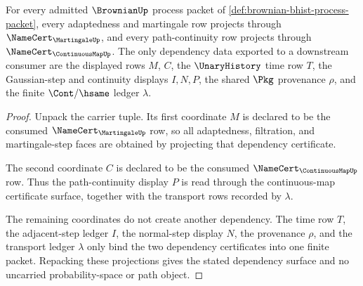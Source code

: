 \begin{theorem}
\label{thm:brownian-martingale-continuousmap-dependency-surface}
For every admitted $\BrownianUp$ process packet of
\autoref{def:brownian-bhist-process-packet}, every adaptedness and martingale
row projects through $\NameCert_{\MartingaleUp}$, and every path-continuity
row projects through $\NameCert_{\ContinuousMapUp}$. The only dependency data
exported to a downstream consumer are the displayed rows $M$, $C$, the
$\UnaryHistory$ time row $T$, the Gaussian-step and continuity displays
$I,N,P$, the shared $\Pkg$ provenance $\rho$, and the finite
$\Cont/\hsame$ ledger $\lambda$.
\end{theorem}
\begin{proof}
Unpack the carrier tuple. Its first coordinate $M$ is declared to be the
consumed $\NameCert_{\MartingaleUp}$ row, so all adaptedness, filtration, and
martingale-step faces are obtained by projecting that dependency certificate.

The second coordinate $C$ is declared to be the consumed
$\NameCert_{\ContinuousMapUp}$ row. Thus the path-continuity display $P$ is
read through the continuous-map certificate surface, together with the
transport rows recorded by $\lambda$.

The remaining coordinates do not create another dependency. The time row $T$,
the adjacent-step ledger $I$, the normal-step display $N$, the provenance
$\rho$, and the transport ledger $\lambda$ only bind the two dependency
certificates into one finite packet. Repacking these projections gives the
stated dependency surface and no uncarried probability-space or path object.
\end{proof}

